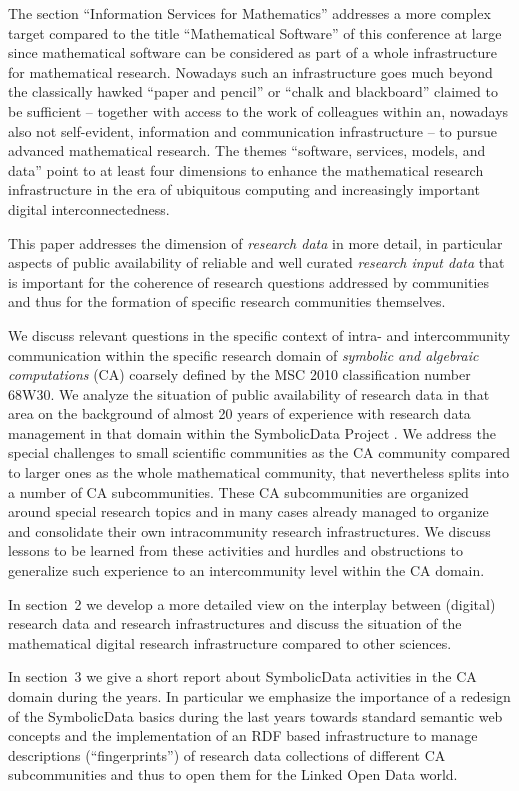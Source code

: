 \documentclass[runningheads,a4paper]{llncs}
\newcommand{\SD}{{\sc Symbo\-lic\-Data}}
\begin{document}
The section ``Information Services for Mathematics'' addresses a more complex
target compared to the title ``Mathematical Software'' of this conference at
large since mathematical software can be considered as part of a whole
infrastructure for mathematical research. Nowadays such an infrastructure goes
much beyond the classically hawked ``paper and pencil'' or ``chalk and
blackboard'' claimed to be sufficient -- together with access to the work of
colleagues within an, nowadays also not self-evident, information and
communication infrastructure -- to pursue advanced mathematical research.  The
themes ``software, services, models, and data'' point to at least four
dimensions to enhance the mathematical research infrastructure in the era of
ubiquitous computing and increasingly important digital interconnectedness.

This paper addresses the dimension of \emph{research data} in more detail, in
particular aspects of public availability of reliable and well curated
\emph{research input data} that is important for the coherence of research
questions addressed by communities and thus for the formation of specific
research communities themselves. 

We discuss relevant questions in the specific context of intra- and
intercommunity communication within the specific research domain of
\emph{symbolic and algebraic computations} (CA) coarsely defined by the MSC
2010 classification number 68W30.  We analyze the situation of public
availability of research data in that area on the background of almost 20 years
of experience with research data management in that domain within the {\SD}
Project \cite{sdwiki}.  We address the special challenges to small scientific
communities as the CA community compared to larger ones as the whole
mathematical community, that nevertheless splits into a number of CA
subcommunities. These CA subcommunities are organized around special research
topics and in many cases already managed to organize and consolidate their own
intracommunity research infrastructures. We discuss lessons to be learned from
these activities and hurdles and obstructions to generalize such experience to
an intercommunity level within the CA domain.

In section~2 we develop a more detailed view on the interplay between (digital)
research data and research infrastructures and discuss the situation of the
mathematical digital research infrastructure compared to other sciences. 

In section~3 we give a short report about {\SD} activities in the CA domain
during the years. In particular we emphasize the importance of a redesign of
the {\SD} basics during the last years towards standard semantic web concepts
and the implementation of an RDF based infrastructure to manage descriptions
(``fingerprints'') of research data collections of different CA subcommunities
and thus to open them for the Linked Open Data world. 
\end{document}
